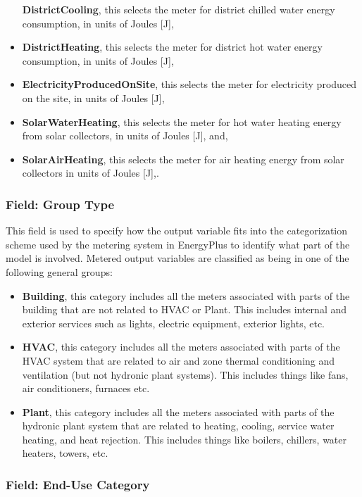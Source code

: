 \begin{itemize}
  \textbf{DistrictCooling}, this selects the meter for district chilled water energy consumption, in units of Joules {[}J{]},
\item
  \textbf{DistrictHeating}, this selects the meter for district hot water energy consumption, in units of Joules {[}J{]},
\item
  \textbf{ElectricityProducedOnSite}, this selects the meter for electricity produced on the site, in units of Joules {[}J{]},
\item
  \textbf{SolarWaterHeating}, this selects the meter for hot water heating energy from solar collectors, in units of Joules {[}J{]}, and,
\item
  \textbf{SolarAirHeating}, this selects the meter for air heating energy from solar collectors in units of Joules {[}J{]},.
\end{itemize}

\subsubsection{Field: Group Type}\label{field-group-type}

This field is used to specify how the output variable fits into the categorization scheme used by the metering system in EnergyPlus to identify what part of the model is involved. Metered output variables are classified as being in one of the following general groups:

\begin{itemize}
\item
  \textbf{Building}, this category includes all the meters associated with parts of the building that are not related to HVAC or Plant. This includes internal and exterior services such as lights, electric equipment, exterior lights, etc.
\item
  \textbf{HVAC}, this category includes all the meters associated with parts of the HVAC system that are related to air and zone thermal conditioning and ventilation (but not hydronic plant systems). This includes things like fans, air conditioners, furnaces etc.
\item
  \textbf{Plant}, this category includes all the meters associated with parts of the hydronic plant system that are related to heating, cooling, service water heating, and heat rejection. This includes things like boilers, chillers, water heaters, towers, etc.
\end{itemize}

\subsubsection{Field: End-Use Category}\label{field-end-use-category}

